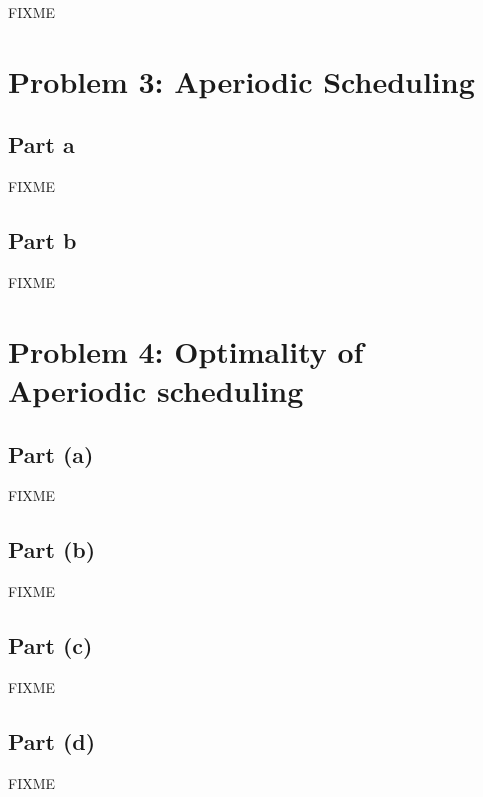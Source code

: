 \documentclass[a4paper,parskip,headheight=38pt]{scrartcl} %
\begin{document}
FIXME


\section*{Problem 3: Aperiodic Scheduling}

\subsection*{Part a}

FIXME

\subsection*{Part b}

FIXME


\section*{Problem 4: Optimality of Aperiodic scheduling}

\subsection*{Part (a)}

FIXME

\subsection*{Part (b)}

FIXME

\subsection*{Part (c)}

FIXME

\subsection*{Part (d)}

FIXME
\end{document}
